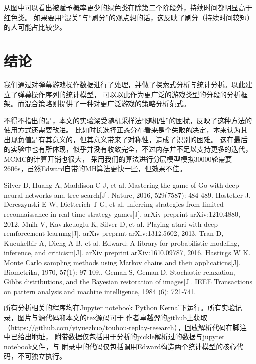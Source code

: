 \documentclass[UTF8]{ctexart}
\begin{document}
从图中可以看出被赋予概率更少的绿色类在除第二个阶段外，持续时间都明显高于红色类。
如果要用“混关”与“刷分”的观点想的话，这反映了刷分（持续时间较短）的人可能占比较少。

\section{结论}

我们通过对弹幕游戏操作数据进行了处理，并做了探索式分析与统计分析。以此建立了弹幕操作序列的统计模型，
可以以此作为更广泛的游戏类型的分段的分析框架。而混合策略则提供了一种对更广泛游戏的策略分析范式。

不得不指出的是，本文的实验深受随机采样法“随机性”的困扰，反映了这种方法的使用方式还需要改进。
比如时长选择正态分布看来是个失败的决定，本来认为其出现负值是有其意义的，但其意义带来了对称性，造成了识别的困难。
这在最后的实验中也有所体现，似乎并没有收敛完全，不过内存并不足以支持更多的迭代，MCMC的计算开销也很大，
采用我们的算法进行分层模型模拟30000轮需要2606s，虽然Edward自带的MH算法更快一些，但效果不佳。

\begin{thebibliography}{9}%
  Silver D, Huang A, Maddison C J, et al. Mastering the game of Go with deep neural networks and tree search[J]. Nature, 2016, 529(7587): 484-489. 	
  Hostetler J, Dereszynski E W, Dietterich T G, et al. Inferring strategies from limited reconnaissance in real-time strategy games[J]. arXiv preprint arXiv:1210.4880, 2012.
  Mnih V, Kavukcuoglu K, Silver D, et al. Playing atari with deep reinforcement learning[J]. arXiv preprint arXiv:1312.5602, 2013.
  Tran D, Kucukelbir A, Dieng A B, et al. Edward: A library for probabilistic modeling, inference, and criticism[J]. arXiv preprint arXiv:1610.09787, 2016.
  Hastings W K. Monte Carlo sampling methods using Markov chains and their applications[J]. Biometrika, 1970, 57(1): 97-109..
  Geman S, Geman D. Stochastic relaxation, Gibbs distributions, and the Bayesian restoration of images[J]. IEEE Transactions on pattern analysis and machine intelligence, 1984 (6): 721-741.
\end{thebibliography}

\newpage
\appendix

所有分析相关的程序均在Jupyter notebook Python Kernal下运行。所有实验记录，图片与源代码和本文的tex源码可于
作者卓越羿的github上获取（https://github.com/yiyuezhuo/touhou-replay-research），回放解析代码在脚注中已给出地址，
附带数据仅包括用于分析的pickle解析过的数据与jupyter notebook文件，与
附录中的代码仅包括调用Edward构造两个统计模型的核心代码，不可独立执行。
\end{document}
